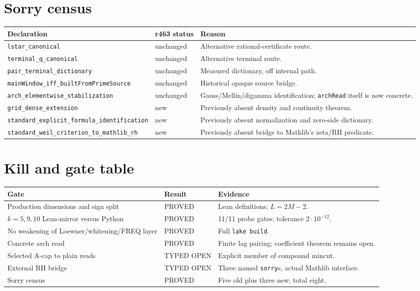 \documentclass[10pt]{article}
\newcommand{\code}[1]{\nolinkurl{#1}}
\newcommand{\proved}{\textcolor{green!40!black}{PROVED}}
\newcommand{\typed}{\textcolor{orange!80!black}{TYPED OPEN}}
\begin{document}
\section{Sorry census}
\begin{longtable}{@{}p{4.5cm}p{2cm}p{7.3cm}@{}}
\toprule
Declaration & r463 status & Reason\\
\midrule
\endhead
\code{lstar_canonical} & unchanged & Alternative rational-certificate route.\\
\code{terminal_q_canonical} & unchanged & Alternative terminal route.\\
\code{pair_terminal_dictionary} & unchanged & Measured dictionary, off internal path.\\
\code{mainWindow_iff_builtFromPrimeSource} & unchanged & Historical opaque source bridge.\\
\code{arch_elementwise_stabilization} & unchanged & Gauss/Mellin/digamma identification; \code{archRead} itself is now concrete.\\
\code{grid_dense_extension} & new & Previously absent density and continuity theorem.\\
\code{standard_explicit_formula_identification} & new & Previously absent normalization and zero-side dictionary.\\
\code{standard_weil_criterion_to_mathlib_rh} & new & Previously absent bridge to Mathlib's zeta/RH predicate.\\
\bottomrule
\end{longtable}

\section{Kill and gate table}
\begin{center}
\small
\begin{tabular}{@{}p{5.1cm}p{2.1cm}p{7cm}@{}}
\toprule
Gate & Result & Evidence\\
\midrule
Production dimensions and sign split & \proved & Lean definitions; $L=2M-2$.\\
$k=5,9,10$ Lean-mirror versus Python & \proved & 11/11 probe gates; tolerance $2\cdot10^{-12}$.\\
No weakening of Loewner/whitening/FREQ layer & \proved & Full \code{lake build}.\\
Concrete arch read & \proved & Finite lag pairing; coefficient theorem remains open.\\
Selected A-cap to plain reads & \typed & Explicit member of compound mincut.\\
External RH bridge & \typed & Three named \code{sorry}s, actual Mathlib interface.\\
Sorry census & \proved & Five old plus three new, total eight.\\
\bottomrule
\end{tabular}
\end{center}
\end{document}
